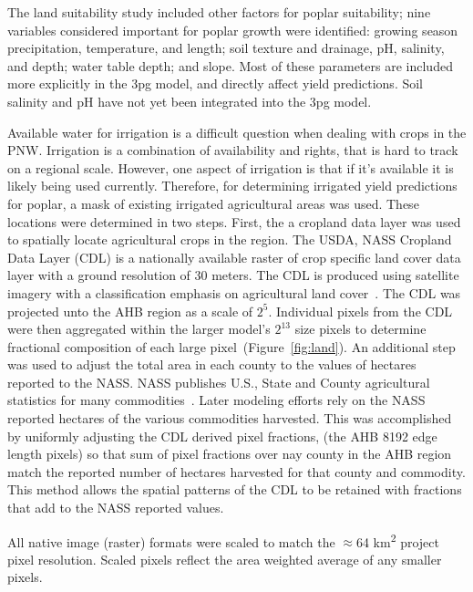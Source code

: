 \documentclass[preprint,12pt]{elsarticle}
\begin{document}
The land suitability study included other factors for poplar
suitability; nine variables considered important for poplar growth
were identified: growing season precipitation, temperature, and
length; soil texture and drainage, pH, salinity, and depth; water
table depth; and slope.  Most of these parameters are included more
explicitly in the \ac{3pg} model, and directly affect yield
predictions.  Soil salinity and pH have not yet been integrated into
the \ac{3pg} model.


Available water for irrigation is a difficult question when dealing
with crops in the \ac{PNW}.  Irrigation is a combination of
availability and rights, that is hard to track on a regional scale.
However, one aspect of irrigation is that if it's available it is
likely being used currently.  Therefore, for determining irrigated
yield predictions for poplar, a mask of existing irrigated
agricultural areas was used.  These locations were determined in two
steps.  First, the a cropland data layer was used to spatially locate
agricultural crops in the region.  The USDA, NASS Cropland Data Layer
(CDL) is a nationally available raster of crop specific land cover
data layer with a ground resolution of 30 meters.  The CDL is produced
using satellite imagery with a classification emphasis on agricultural
land cover~\cite{Boryan2011a}.  The CDL was projected unto the \ac{AHB}
region as a scale of $2^5$.  Individual pixels from the CDL were then
aggregated within the larger model's $2^{13}$ size pixels to determine
fractional composition of each large pixel~(Figure~\ref{fig:land}).  An
additional step was used to adjust the total area in each county to
the values of hectares reported to the \ac{NASS}.  \ac{NASS} publishes
U.S., State and County agricultural statistics for many
commodities~\cite{Service2015}.  Later modeling efforts rely on
the \ac{NASS} reported hectares of the various commodities harvested.
This was accomplished by uniformly adjusting the CDL derived pixel
fractions, (the \ac{AHB} 8192 edge length pixels) so that sum of pixel
fractions over nay county in the \ac{AHB} region match the reported
number of hectares harvested for that county and commodity.  This
method allows the spatial patterns of the CDL to be retained with
fractions that add to the \ac{NASS} reported values.

All native image (raster) formats were scaled to match the $\approx$64
km\textsuperscript{2} project pixel resolution. Scaled pixels reflect
the area weighted average of any smaller pixels.
\end{document}
